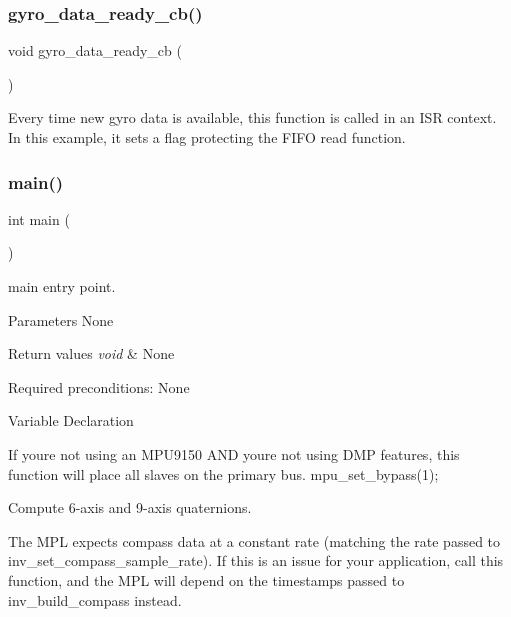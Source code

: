 \subsubsection{gyro\+\_\+data\+\_\+ready\+\_\+cb()}
{\footnotesize\ttfamily void gyro\+\_\+data\+\_\+ready\+\_\+cb (\begin{DoxyParamCaption}\item[{void}]{ }\end{DoxyParamCaption})}

Every time new gyro data is available, this function is called in an I\+SR context. In this example, it sets a flag protecting the F\+I\+FO read function. \mbox{\label{group__e_m_p_l_ga840291bc02cba5474a4cb46a9b9566fe}} 
\subsubsection{main()}
{\footnotesize\ttfamily int main (\begin{DoxyParamCaption}\item[{void}]{ }\end{DoxyParamCaption})}



main entry point. 

\begin{DoxyParagraph}{Parameters None}

\end{DoxyParagraph}

\begin{DoxyRetVals}{Return values}
{\em void} & None \\
\hline
\end{DoxyRetVals}
\begin{DoxyParagraph}{Required preconditions\+: None}

\end{DoxyParagraph}
Variable Declaration

If you\textquotesingle{}re not using an M\+P\+U9150 A\+ND you\textquotesingle{}re not using D\+MP features, this function will place all slaves on the primary bus. mpu\+\_\+set\+\_\+bypass(1);

Compute 6-\/axis and 9-\/axis quaternions.

The M\+PL expects compass data at a constant rate (matching the rate passed to inv\+\_\+set\+\_\+compass\+\_\+sample\+\_\+rate). If this is an issue for your application, call this function, and the M\+PL will depend on the timestamps passed to inv\+\_\+build\+\_\+compass instead.

